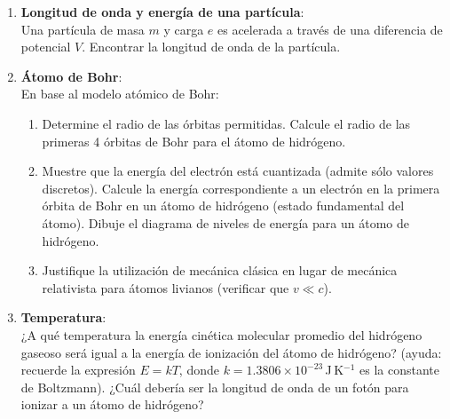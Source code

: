 \documentclass[a4paper,12pt]{article}
\begin{document}
\begin{enumerate}

\item {\bf{Longitud de onda y energía de una partícula}}:\\
	Una partícula de masa $m$ y carga $e$ es acelerada a través de una
		diferencia de potencial $V$. Encontrar la longitud de onda de la
		partícula. 

\item {\bf{Átomo de Bohr}}:\\
	En base al modelo atómico de Bohr:
	\begin{enumerate}
		\item Determine el radio de las órbitas permitidas. Calcule el radio de
			las primeras 4 órbitas de Bohr para el átomo de hidrógeno.
		\item Muestre que la energía del electrón está cuantizada (admite sólo
			valores discretos). Calcule la energía correspondiente a un
			electrón en la primera órbita de Bohr en un átomo de hidrógeno
			(estado fundamental del átomo). Dibuje el diagrama de niveles de
			energía para un átomo de hidrógeno.
		\item Justifique la utilización de mecánica clásica en lugar de
			mecánica relativista para átomos livianos (verificar que $v \ll
			c$).
	\end{enumerate}

\item {\bf{Temperatura}}:\\
	¿A qué temperatura la energía cinética molecular promedio del hidrógeno
		gaseoso será igual a la energía de ionización del átomo de hidrógeno?
		(ayuda: recuerde la expresión $E=k T$, donde $k=1.3806 \times
		10^{-23}$\,J\,K$^{-1}$ es la constante de Boltzmann). ¿Cuál debería ser
		la longitud de onda de un fotón para ionizar a un átomo de hidrógeno?
	

\end{enumerate}
\end{document}

